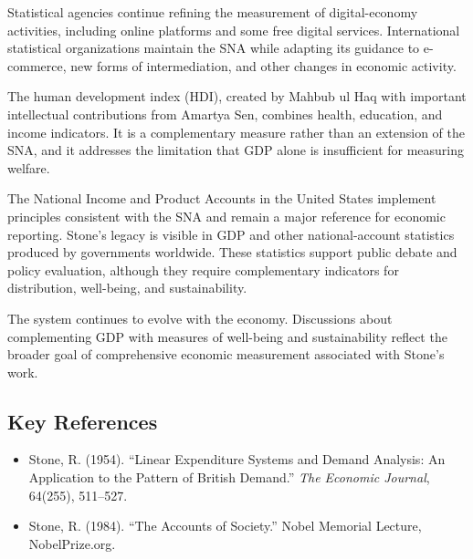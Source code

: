 Statistical agencies continue refining the measurement of digital-economy
activities, including online platforms and some free digital services.
International statistical organizations maintain the SNA while adapting its
guidance to e-commerce, new forms of intermediation, and other changes in
economic activity.

The human development index (HDI), created by Mahbub ul Haq with important
intellectual contributions from Amartya Sen, combines health, education, and
income indicators. It is a complementary measure rather than an extension of
the SNA, and it addresses the limitation that GDP alone is insufficient for
measuring welfare.

The National Income and Product Accounts in the United States implement
principles consistent with the SNA and remain a major reference for economic
reporting. Stone's legacy is visible in GDP and other national-account
statistics produced by governments worldwide. These statistics support public
debate and policy evaluation, although they require complementary indicators
for distribution, well-being, and sustainability.

The system continues to evolve with the economy. Discussions about complementing
GDP with measures of well-being and sustainability reflect the broader goal of
comprehensive economic measurement associated with Stone's work.

\subsection*{Key References}
\begin{itemize}
    \item Stone, R. (1954). ``Linear Expenditure Systems and Demand Analysis: An Application to the Pattern of British Demand.'' \textit{The Economic Journal}, 64(255), 511--527.
    \item Stone, R. (1984). ``The Accounts of Society.'' Nobel Memorial Lecture, NobelPrize.org.
\end{itemize}
